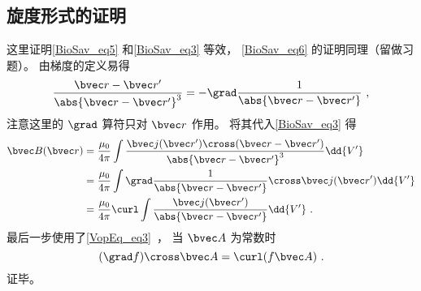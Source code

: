 \subsection{旋度形式的证明}
这里证明\autoref{BioSav_eq5} 和\autoref{BioSav_eq3} 等效， \autoref{BioSav_eq6} 的证明同理（留做习题）。 由梯度的定义易得
\begin{equation}
\frac{\bvec r - \bvec r'}{\abs{\bvec r - \bvec r'}^3} = -\grad \frac{1}{\abs{\bvec r - \bvec r'}}~,
\end{equation}
注意这里的 $\grad$ 算符只对 $\bvec r $ 作用。 将其代入\autoref{BioSav_eq3} 得
\begin{equation}
\begin{aligned}
\bvec B(\bvec r) &= \frac{\mu_0}{4\pi} \int \frac{\bvec j(\bvec r') \cross (\bvec r - \bvec r')}{\abs{\bvec r - \bvec r'}^3} \dd{V'}\\
&= \frac{\mu_0}{4\pi} \int \grad \frac{1}{\abs{\bvec r - \bvec r'}} \cross \bvec j(\bvec r') \dd{V'}\\
&= \frac{\mu_0}{4\pi} \curl \int \frac{\bvec j(\bvec r')}{\abs{\bvec r - \bvec r'}} \dd{V'}~.
\end{aligned}
\end{equation}
最后一步使用了\autoref{VopEq_eq3}~， 当 $\bvec A$ 为常数时
\begin{equation}
(\grad f) \cross\bvec A = \curl(f\bvec A)~.
\end{equation}
证毕。
